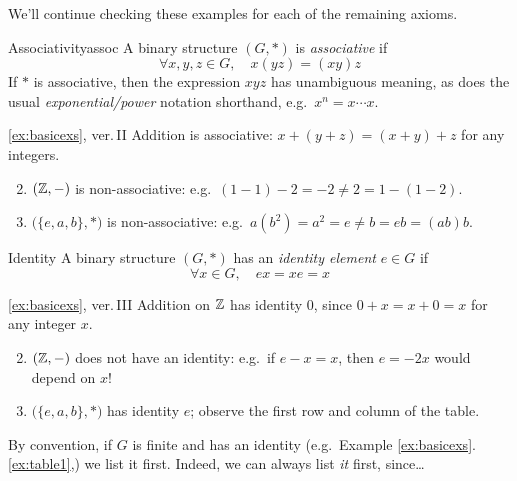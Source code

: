 We'll continue checking these examples for each of the remaining axioms.


\begin{defn}{Associativity}{assoc}
	A binary structure $(G,\ast)$ is \emph{associative} if
	\[
		\forall x,y,z\in G,\quad x(yz)=(xy)z
	\]
	If $\ast$ is associative, then the expression $x y z$ has unambiguous meaning, as does the usual \emph{exponential/power} notation shorthand, e.g.\ $x^n=x\cdots x$.
\end{defn}


\begin{examples*}{\ref{ex:basicexs}, ver.\,II}{}
	\exstart Addition is associative: $x+(y+z)=(x+y)+z$ for any integers.\vspace{-2pt}
	\begin{enumerate}\setcounter{enumi}{1}\itemsep2pt
	  \item $(\mathbb{Z},-)$ is non-associative: e.g.\ $(1-1)-2=-2\neq 2=1-(1-2)$.
	  \item $\bigl(\{e,a,b\},*\bigr)$ is non-associative: e.g.\ $a(b^2)=a^2=e\neq b=eb=(ab)b$.
	\end{enumerate}
\end{examples*}

\goodbreak

\begin{defn}{Identity}{}
	A binary structure $(G,\ast)$ has an \emph{identity element} $e\in G$ if
	\[
		\forall x\in G,\quad ex=xe=x
	\]
\end{defn}

\begin{examples*}{\ref{ex:basicexs}, ver.\,III}{}
	\exstart Addition on $\mathbb{Z}$ has identity 0, since $0+x=x+0=x$ for any integer $x$.
	\begin{enumerate}\setcounter{enumi}{1}\itemsep2pt
	  \item $(\mathbb{Z},-)$ does not have an identity: e.g.\ if $e-x=x$, then $e=-2x$ would depend on $x$!
	  \item $\bigl(\{e,a,b\},*\bigr)$ has identity $e$; observe the first row and column of the table.
	\end{enumerate}
\end{examples*}

By convention, if $G$ is finite and has an identity (e.g.\ Example \ref*{ex:basicexs}.\ref{ex:table1},) we list it first. Indeed, we can always list \emph{it} first, since\ldots

